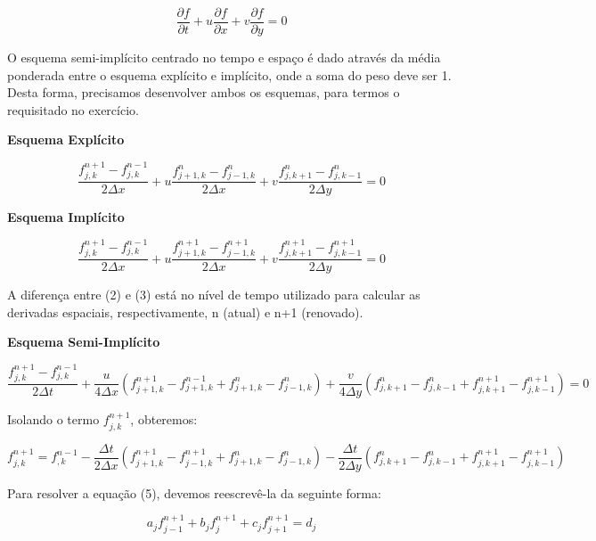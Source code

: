 \documentclass[11pt]{article}
\begin{document}
\begin{equation}
    \frac{\partial{f}}{\partial{t}} + u\frac{\partial{f}}{\partial{x}} + v\frac{\partial{f}}{\partial{y}} = 0
\end{equation}

O esquema semi-implícito centrado no tempo e espaço é dado através da
média ponderada entre o esquema explícito e implícito, onde a soma do
peso deve ser 1. Desta forma, precisamos desenvolver ambos os esquemas,
para termos o requisitado no exercício.

\textbf{Esquema Explícito}

\begin{equation}
    \frac{ f^{n+1}_{j,k} - f^{n-1}_{j,k} }{2\Delta{x}} + u\frac{ f^{n}_{j+1,k} - f^{n}_{j-1,k} }{2\Delta{x}} + v\frac{f^{n}_{j,k+1} - f^{n}_{j,k-1}}{2\Delta{y}} = 0
\end{equation}

\textbf{Esquema Implícito}

\begin{equation}
    \frac{ f^{n+1}_{j,k} - f^{n-1}_{j,k} }{2\Delta{x}} + u\frac{ f^{n+1}_{j+1,k} - f^{n+1}_{j-1,k} }{2\Delta{x}} + v\frac{f^{n+1}_{j,k+1} - f^{n+1}_{j,k-1}}{2\Delta{y}} = 0
\end{equation}

A diferença entre (2) e (3) está no nível de tempo utilizado para
calcular as derivadas espaciais, respectivamente, n (atual) e n+1
(renovado).

\textbf{Esquema Semi-Implícito}

\begin{equation}
    \frac{f^{n+1}_{j,k} - f^{n-1}_{j,k}}{2\Delta{t}} + \frac{u}{4\Delta{x}}(f^{n+1}_{j+1,k} - f^{n-1}_{j+1,k} + f^{n}_{j+1,k} - f^{n}_{j-1,k}) + \frac{v}{4\Delta{y}}( f^{n}_{j,k+1} - f^{n}_{j,k-1} + f^{n+1}_{j,k+1} -f^{n+1}_{j,k-1} ) = 0
\end{equation}

Isolando o termo \(f^{n+1}_{j,k}\), obteremos:

\begin{equation}
    f^{n+1}_{j,k} = f^{n-1}_{,k} - \frac{\Delta{t}}{2\Delta{x}}(f^{n+1}_{j+1,k} - f^{n+1}_{j-1,k} + f^{n}_{j+1,k} - f^{n}_{j-1,k}) - \frac{\Delta{t}}{2\Delta{y}}( f^{n}_{j,k+1} - f^{n}_{j,k-1} + f^{n+1}_{j,k+1} - f^{n+1}_{j,k-1})
\end{equation}

Para resolver a equação (5), devemos reescrevê-la da seguinte forma:

\begin{equation}
   a_jf^{n+1}_{j-1} + b_jf^{n+1}_{j} + c_jf^{n+1}_{j+1} = d_j
\end{equation}
\end{document}
